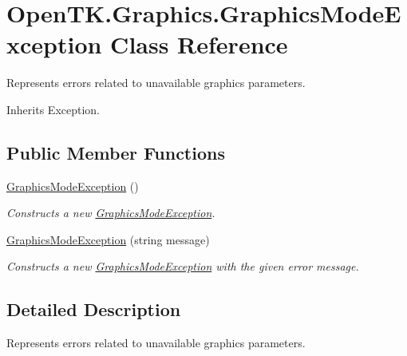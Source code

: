 \hypertarget{class_open_t_k_1_1_graphics_1_1_graphics_mode_exception}{\section{Open\-T\-K.\-Graphics.\-Graphics\-Mode\-Exception Class Reference}
\label{class_open_t_k_1_1_graphics_1_1_graphics_mode_exception}
}


Represents errors related to unavailable graphics parameters.  




Inherits Exception.

\subsection*{Public Member Functions}
\begin{DoxyCompactItemize}
\item 
\hyperlink{class_open_t_k_1_1_graphics_1_1_graphics_mode_exception_a887ec4693b97e0f268008799dc8bd773}{Graphics\-Mode\-Exception} ()
\begin{DoxyCompactList}\small\item\em Constructs a new \hyperlink{class_open_t_k_1_1_graphics_1_1_graphics_mode_exception}{Graphics\-Mode\-Exception}. \end{DoxyCompactList}\item 
\hyperlink{class_open_t_k_1_1_graphics_1_1_graphics_mode_exception_a943c06a85e912998954a66e620072e60}{Graphics\-Mode\-Exception} (string message)
\begin{DoxyCompactList}\small\item\em Constructs a new \hyperlink{class_open_t_k_1_1_graphics_1_1_graphics_mode_exception}{Graphics\-Mode\-Exception} with the given error message. \end{DoxyCompactList}\end{DoxyCompactItemize}


\subsection{Detailed Description}
Represents errors related to unavailable graphics parameters. 



